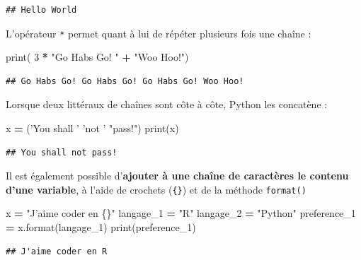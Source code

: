 \documentclass[12pt,]{book}
\newenvironment{Shaded}{\begin{snugshade}}{\end{snugshade}}
\newcommand{\DecValTok}[1]{\textcolor[rgb]{0.00,0.00,0.81}{#1}}
\newcommand{\SpecialCharTok}[1]{\textcolor[rgb]{0.00,0.00,0.00}{#1}}
\newcommand{\StringTok}[1]{\textcolor[rgb]{0.31,0.60,0.02}{#1}}
\newcommand{\OperatorTok}[1]{\textcolor[rgb]{0.81,0.36,0.00}{\textbf{#1}}}
\newcommand{\BuiltInTok}[1]{#1}
\newcommand{\NormalTok}[1]{#1}
\numberwithin{equation}{section}
\numberwithin{countremarque}{section}
\begin{document}
\begin{lstlisting}
## Hello World
\end{lstlisting}

L'opérateur \texttt{*} permet quant à lui de répéter plusieurs fois une
chaîne :

\begin{Shaded}
\begin{Highlighting}[]
\BuiltInTok{print}\NormalTok{( }\DecValTok{3} \OperatorTok{*} \StringTok{"Go Habs Go! "} \OperatorTok{+} \StringTok{"Woo Hoo!"}\NormalTok{)}
\end{Highlighting}
\end{Shaded}

\begin{lstlisting}
## Go Habs Go! Go Habs Go! Go Habs Go! Woo Hoo!
\end{lstlisting}

Lorsque deux littéraux de chaînes sont côte à côte, Python les concatène
:

\begin{Shaded}
\begin{Highlighting}[]
\NormalTok{x }\OperatorTok{=}\NormalTok{ (}\StringTok{'You shall '} \StringTok{'not '} \StringTok{"pass!"}\NormalTok{)}
\BuiltInTok{print}\NormalTok{(x)}
\end{Highlighting}
\end{Shaded}

\begin{lstlisting}
## You shall not pass!
\end{lstlisting}

Il est également possible d'\textbf{ajouter à une chaîne de caractères
le contenu d'une variable}, à l'aide de crochets (\texttt{\{\}}) et de
la méthode \texttt{format()}

\begin{Shaded}
\begin{Highlighting}[]
\NormalTok{x }\OperatorTok{=} \StringTok{"J'aime coder en }\SpecialCharTok{\{\}}\StringTok{"}
\NormalTok{langage_1 }\OperatorTok{=} \StringTok{"R"}
\NormalTok{langage_2 }\OperatorTok{=} \StringTok{"Python"}
\NormalTok{preference_1 }\OperatorTok{=}\NormalTok{ x.}\BuiltInTok{format}\NormalTok{(langage_1)}
\BuiltInTok{print}\NormalTok{(preference_1)}
\end{Highlighting}
\end{Shaded}

\begin{lstlisting}
## J'aime coder en R
\end{lstlisting}
\end{document}
